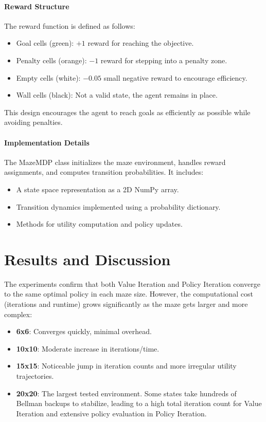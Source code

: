 \documentclass[11pt]{article}
\begin{document}
\paragraph{Reward Structure} \leavevmode\newline
The reward function is defined as follows:
\begin{itemize}
    \item Goal cells (green): $+1$ reward for reaching the objective.
    \item Penalty cells (orange): $-1$ reward for stepping into a penalty zone.
    \item Empty cells (white): $-0.05$ small negative reward to encourage efficiency.
    \item Wall cells (black): Not a valid state, the agent remains in place.
\end{itemize}
This design encourages the agent to reach goals as efficiently as possible while avoiding penalties.

\paragraph{Implementation Details} \leavevmode\newline
The MazeMDP class initializes the maze environment, handles reward assignments, and computes transition probabilities. It includes:
\begin{itemize}
    \item A state space representation as a 2D NumPy array.
    \item Transition dynamics implemented using a probability dictionary.
    \item Methods for utility computation and policy updates.
\end{itemize}


\newpage
\section{Results and Discussion}
\label{sec:results}
The experiments confirm that both Value Iteration and Policy Iteration converge to the same optimal policy in each maze size. However, the computational cost (iterations and runtime) grows significantly as the maze gets larger and more complex:
\begin{itemize}
    \item \textbf{6x6}: Converges quickly, minimal overhead.
    \item \textbf{10x10}: Moderate increase in iterations/time.
    \item \textbf{15x15}: Noticeable jump in iteration counts and more irregular utility trajectories.
    \item \textbf{20x20}: The largest tested environment. Some states take hundreds of Bellman backups to stabilize, leading to a high total iteration count for Value Iteration and extensive policy evaluation in Policy Iteration.
\end{itemize}
\end{document}
